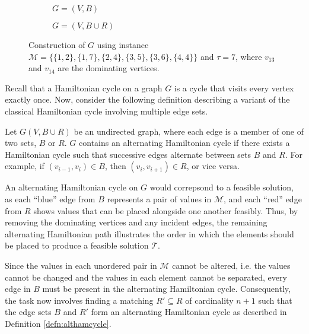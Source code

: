 \documentclass[oribibl]{llncs}
\begin{document}
\begin{figure}	
\centering
\begin{subfigure}[h]{0.45\textwidth}
	
	\caption{$G = (V, B)$}	
	\label{fig:partners}
\end{subfigure} \hspace{40pt}
\begin{subfigure}[h]{0.45\textwidth}
	
	\caption{$G=(V, B \cup R)$}	
	\label{fig:threshold}
\end{subfigure}
\caption{Construction of $G$ using instance $\mathcal{M} = \{\{1,2\}, \{1,7\}, \{2,4\}, \{3,5\}, \{3,6\}, \{4,4\}\}$ and $\tau = 7$, where $v_{13}$ and $v_{14}$ are the dominating vertices.}
\label{fig:partners/threshold}
\end{figure}

Recall that a Hamiltonian cycle on a graph $G$ is a cycle that visits every vertex exactly once. Now, consider the following definition describing a variant of the classical Hamiltonian cycle involving multiple edge sets.
\begin{definition}
	\label{defn:althamcycle}
	Let $G(V, B\cup R)$ be an undirected graph, where each edge is a member of one of two sets, $B$ or $R$. $G$ contains an alternating Hamiltonian cycle if there exists a Hamiltonian cycle such that successive edges alternate between sets $B$ and $R$. For example, if $(v_{i-1}, v_i) \in B$, then $(v_i, v_{i+1}) \in R$, or vice versa.
\end{definition}

An alternating Hamiltonian cycle on $G$ would correpsond to a feasible solution, as each ``blue'' edge from $B$ represents a pair of values in $\mathcal{M}$, and each ``red'' edge from $R$ shows values that can be placed alongside one another feasibly. Thus, by removing the dominating vertices and any incident edges, the remaining alternating Hamiltonian path illustrates the order in which the elements should be placed to produce a feasible solution $\mathcal{T}$.

Since the values in each unordered pair in $\mathcal{M}$ cannot be altered, i.e. the values cannot be changed and the values in each element cannot be separated, every edge in $B$ must be present in the alternating Hamiltonian cycle. Consequently, the task now involves finding a matching $R' \subseteq R$ of cardinality $n+1$ such that the edge sets $B$ and $R'$ form an alternating Hamiltonian cycle as described in Definition \ref{defn:althamcycle}. 
\end{document}
